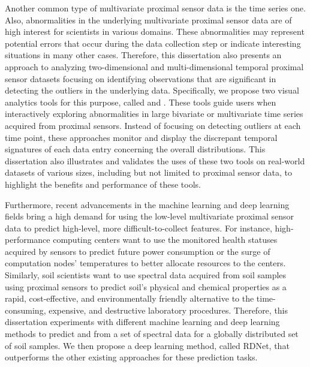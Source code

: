 Another common type of multivariate proximal sensor data is the time series one. Also, abnormalities in the underlying multivariate proximal sensor data are of high interest for scientists in various domains. These abnormalities may represent potential errors that occur during the data collection step or indicate interesting situations in many other cases. Therefore, this dissertation also presents an approach to analyzing two-dimensional and multi-dimensional temporal proximal sensor datasets focusing on identifying observations that are significant in detecting the outliers in the underlying data. Specifically, we propose two visual analytics tools for this purpose, called \outliagnostics{} and \mtsad{}. These tools guide users when interactively exploring abnormalities in large bivariate or multivariate time series acquired from proximal sensors. Instead of focusing on detecting outliers at each time point, these approaches monitor and display the discrepant temporal signatures of each data entry concerning the overall distributions. This dissertation also illustrates and validates the uses of these two tools on real-world datasets of various sizes, including but not limited to proximal sensor data, to highlight the benefits and performance of these tools.

Furthermore, recent advancements in the machine learning and deep learning fields bring a high demand for using the low-level multivariate proximal sensor data to predict high-level, more difficult-to-collect features. For instance, high-performance computing centers want to use the monitored health statuses acquired by sensors to predict future power consumption or the surge of computation nodes' temperatures to better allocate resources to the centers. Similarly, soil scientists want to use spectral data acquired from soil samples using proximal sensors to predict soil's physical and chemical properties as a rapid, cost-effective, and environmentally friendly alternative to the time-consuming, expensive, and destructive laboratory procedures. Therefore, this dissertation experiments with different machine learning and deep learning methods to predict \phho{} and \phkcl{} from a set of \visnir{} spectral data for a globally distributed set of soil samples. We then propose a deep learning method, called RDNet, that outperforms the other existing approaches for these prediction tasks.
 
 